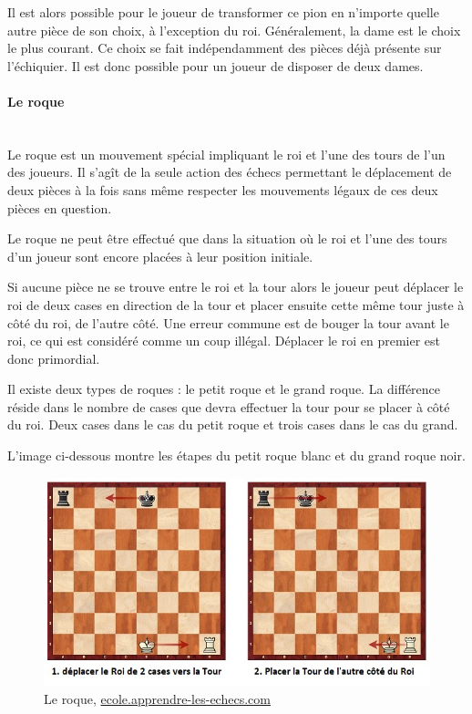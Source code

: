 \huge\documentclass{article}
\begin{document}
    Il est alors possible pour le joueur de transformer ce pion en n'importe quelle autre pièce de son choix, à l'exception du roi. Généralement, la dame est le choix le plus courant. Ce choix se fait indépendamment des pièces déjà présente sur l'échiquier. Il est donc possible pour un joueur de disposer de deux dames.

    \paragraph{Le roque}
    ~~\\

    Le roque est un mouvement spécial impliquant le roi et l'une des tours de l'un des joueurs. Il s'agît de la seule action des échecs permettant le déplacement de deux pièces à la fois sans même respecter les mouvements légaux de ces deux pièces en question.

    Le roque ne peut être effectué que dans la situation où le roi et l'une des tours d'un joueur sont encore placées à leur position initiale.

    Si aucune pièce ne se trouve entre le roi et la tour alors le joueur peut déplacer le roi de deux cases en direction de la tour et placer ensuite cette même tour juste à côté du roi, de l'autre côté. Une erreur commune est de bouger la tour avant le roi, ce qui est considéré comme un coup illégal. Déplacer le roi en premier est donc primordial.

    Il existe deux types de roques : le petit roque et le grand roque. La différence réside dans le nombre de cases que devra effectuer la tour pour se placer à côté du roi. Deux cases dans le cas du petit roque et trois cases dans le cas du grand.

    L'image ci-dessous montre les étapes du petit roque blanc et du grand roque noir.

    \begin{figure}[h]
        \centering
        \includegraphics[scale=0.8]{img/roque.jpg}
        \caption{Le roque,
            \href{https://ecole.apprendre-les-echecs.com/roque/}{ecole.apprendre-les-echecs.com}}
    \end{figure}
\end{document}
